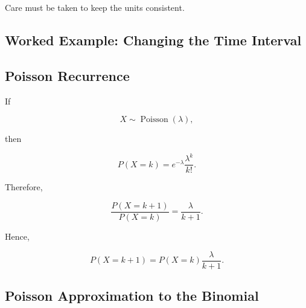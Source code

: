 Care must be taken to keep the units consistent.

\subsection{Worked Example: Changing the Time Interval}
\label{subsec:worked-poisson-scaling}


\subsection{Poisson Recurrence}
\label{subsec:poisson-recurrence}

If

\[
X\sim\operatorname{Poisson}(\lambda),
\]

then

\[
P(X=k)
=
e^{-\lambda}
\frac{\lambda^k}{k!}.
\]

Therefore,

\[
\frac{P(X=k+1)}{P(X=k)}
=
\frac{\lambda}{k+1}.
\]

Hence,

\[
\boxed{
P(X=k+1)
=
P(X=k)
\frac{\lambda}{k+1}.
}
\]

\subsection{Poisson Approximation to the Binomial}
\label{subsec:poisson-binomial-approximation}

